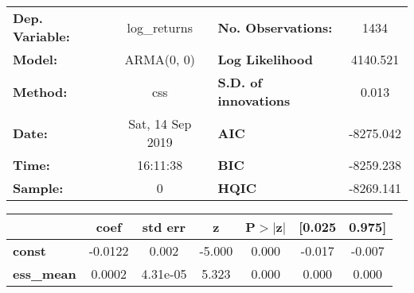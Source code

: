 \begin{center}
\begin{tabular}{lclc}
\toprule
\textbf{Dep. Variable:} &   log\_returns   & \textbf{  No. Observations:  } &    1434     \\
\textbf{Model:}         &    ARMA(0, 0)    & \textbf{  Log Likelihood     } &  4140.521   \\
\textbf{Method:}        &       css        & \textbf{  S.D. of innovations} &   0.013     \\
\textbf{Date:}          & Sat, 14 Sep 2019 & \textbf{  AIC                } & -8275.042   \\
\textbf{Time:}          &     16:11:38     & \textbf{  BIC                } & -8259.238   \\
\textbf{Sample:}        &        0         & \textbf{  HQIC               } & -8269.141   \\
\bottomrule
\end{tabular}
\begin{tabular}{lcccccc}
                   & \textbf{coef} & \textbf{std err} & \textbf{z} & \textbf{P$> |$z$|$} & \textbf{[0.025} & \textbf{0.975]}  \\
\midrule
\textbf{const}     &      -0.0122  &        0.002     &    -5.000  &         0.000        &       -0.017    &       -0.007     \\
\textbf{ess\_mean} &       0.0002  &     4.31e-05     &     5.323  &         0.000        &        0.000    &        0.000     \\
\bottomrule
\end{tabular}
\end{center}
